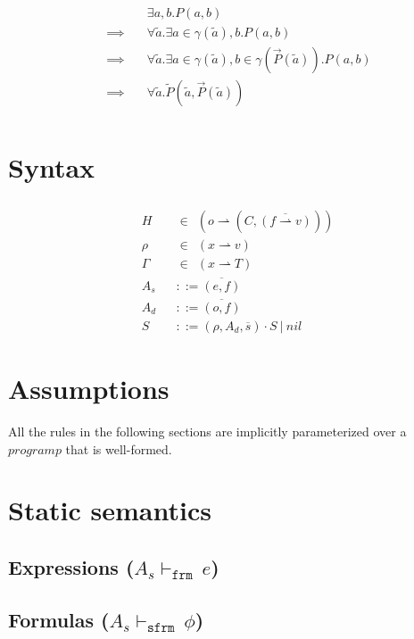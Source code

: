 \documentclass[11pt,a4paper]{article}
\newcommand{\grad}[1]{\widetilde{#1}}
\newcommand{\sfrme}{\ensuremath{\vdash_\texttt{frm}}\,}
\newcommand{\sfrmphi}{\ensuremath{\vdash_\texttt{sfrm}}\,}
\begin{document}
\begin{align*}
&\exists a, b. P(a, b) \\
\quad\implies\quad
&\forall \grad{a}. \exists a \in \gamma(\grad{a}), b. P(a, b) \\
\quad\implies\quad
&\forall \grad{a}. \exists a \in \gamma(\grad{a}), b \in \gamma(\vec{P}(\grad{a})). P(a, b) \\
\quad\implies\quad
&\forall \grad{a}. \grad{P}(\grad{a}, \vec{P}(\grad{a})) \\
\end{align*} 


\section{Syntax}%


\begin{align*}	  
\\ &H			&&\in~~ (o \rightharpoonup (C,\overline{(f \rightharpoonup v)}))
\\ &\rho		&&\in~~ (x \rightharpoonup v)
\\ &\Gamma		&&\in~~ (x \rightharpoonup T)
\\ &A_s			&&::= \overline{(e, f)}
\\ &A_d			&&::= \overline{(o, f)}
\\ &S			&&::= (\rho, A_d, \overline{s}) \cdot S ~|~ nil
\end{align*}

\section{Assumptions}%
All the rules in the following sections are implicitly parameterized over a $program p$ that is well-formed.

\section{Static semantics}

\subsection{Expressions ($A_s \sfrme e$)}


\subsection{Formulas ($A_s \sfrmphi \phi$)}

\end{document}
